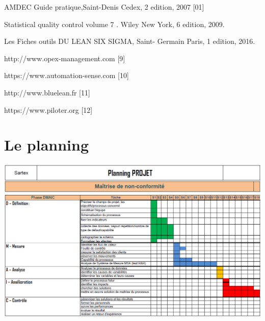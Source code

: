 \documentclass[12pt, a4paper]{thesis}
\begin{document}
\item AMDEC Guide pratique,Saint-Denis Cedex, 2 edition, 2007 [01]
\item Statistical quality control volume 7 . Wiley New York, 6 edition, 2009.
\item Les Fiches outils DU LEAN SIX SIGMA, Saint- Germain Paris, 1 edition, 2016. 
\item http://www.opex-management.com [9]
 \item https://www.automation-sense.com [10]
\item http://www.bluelean.fr [11]
\item https://www.piloter.org [12]

\appendix
{}


\section{Le planning}
\label{nour}
 \includegraphics[scale=0.7 , angle=90]{b.PNG}
 \begin{center}
     

 \end{center}
 
\label{nour11111} 
 
 

\label{nour11}
\end{document}
